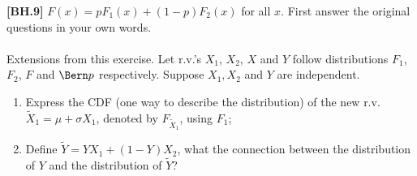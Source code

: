 \begin{exercise}
	\textbf{[BH.9]} $F(x) = p F_1(x)+ (1 - p) F_2(x)$ for all $x$. First answer the original questions in your own words. \\~\\
	Extensions from this exercise. Let r.v.'s $X_1$, $X_2$, $X$ and $Y$ follow distributions $F_1$, $F_2$, $F$ and $\Bern p$ respectively. Suppose $X_1,X_2$ and $Y$ are independent.
\begin{enumerate}
	\item Express the CDF (one way to describe the distribution) of the new r.v. $\tilde{X}_1=\mu+ \sigma X_1$, denoted by $F_{\tilde{X}_1}$, using $F_1$;
	\item Define $\tilde{Y}=YX_1+(1-Y)X_2$, what the connection between the distribution of $Y$ and the distribution of $\tilde{Y}$?
\end{enumerate}
\end{exercise}
